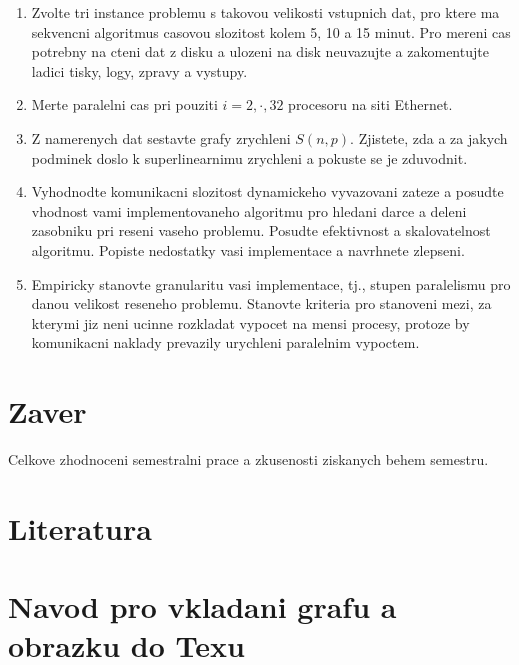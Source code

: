 \documentclass[czech]{article}
\begin{document}
\begin{enumerate}
\item Zvolte tri instance problemu s takovou velikosti vstupnich dat, pro ktere ma sekvencni 
algoritmus casovou slozitost kolem 5, 10 a 15 minut.
Pro mereni cas potrebny na cteni dat z disku a ulozeni na disk neuvazujte a zakomentujte
ladici tisky, logy, zpravy a vystupy.
\item Merte paralelni cas pri pouziti $i=2,\cdot,32$ procesoru na siti Ethernet.
\item Z namerenych dat sestavte grafy zrychleni $S(n,p)$. Zjistete, zda a za jakych podminek
doslo k superlinearnimu zrychleni a pokuste se je zduvodnit.
\item Vyhodnodte komunikacni slozitost dynamickeho vyvazovani zateze a posudte
vhodnost vami implementovaneho algoritmu pro hledani darce a deleni zasobniku pri reseni vaseho
problemu. Posudte efektivnost a skalovatelnost algoritmu. Popiste nedostatky
vasi implementace a navrhnete zlepseni.
\item Empiricky stanovte 
granularitu vasi implementace, tj., stupen paralelismu pro danou velikost reseneho
problemu. Stanovte kriteria pro stanoveni mezi, za kterymi jiz neni
ucinne rozkladat vypocet na mensi procesy, protoze by komunikacni
naklady prevazily urychleni paralelnim vypoctem.

\end{enumerate}

\section{Zaver}

Celkove zhodnoceni semestralni prace a zkusenosti ziskanych behem semestru.

\section{Literatura}

\appendix

\section{Navod pro vkladani grafu a obrazku do Texu}
\end{document}
